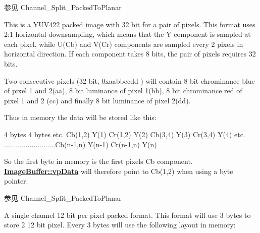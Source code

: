 \begin{Desc}
\begin{description}
\begin{DoxySeeAlso}{参见}
Channel\+\_\+\+Split\+\_\+\+Packed\+To\+Planar 
\end{DoxySeeAlso}
\item[{\em 
\hypertarget{group___common_interface_gga02e0fc32ff10e0bc0f2e8b9c321d65c9a94702ea714cdae3d691e8b0fff84182c}{idpf\+Y\+U\+V422\+\_\+\+U\+Y\+V\+Y\+Packed}\label{group___common_interface_gga02e0fc32ff10e0bc0f2e8b9c321d65c9a94702ea714cdae3d691e8b0fff84182c}
}]This is a Y\+U\+V422 packed image with 32 bit for a pair of pixels. This format uses 2\+:1 horizontal downsampling, which means that the Y component is sampled at each pixel, while U(\+Cb) and V(\+Cr) components are sampled every 2 pixels in horizontal direction. If each component takes 8 bits, the pair of pixels requires 32 bits.

Two consecutive pixels (32 bit, 0xaabbccdd ) will contain 8 bit chrominance blue of pixel 1 and 2(aa), 8 bit luminance of pixel 1(bb), 8 bit chrominance red of pixel 1 and 2 (cc) and finally 8 bit luminance of pixel 2(dd).

Thus in memory the data will be stored like this\+:


\begin{DoxyCode}
4 bytes                   4 bytes                         etc.
Cb(1,2) Y(1) Cr(1,2) Y(2) Cb(3,4)   Y(3)   Cr(3,4)   Y(4)    etc.
..........................Cb(n-1,n) Y(n-1) Cr(n-1,n) Y(n)
\end{DoxyCode}


So the first byte in memory is the first pixels Cb component. {\bfseries \hyperlink{struct_image_buffer_ab67c9c21d749e786302c848b508e0673}{Image\+Buffer\+::vp\+Data}} will therefore point to Cb(1,2) when using a byte pointer.

\begin{DoxySeeAlso}{参见}
Channel\+\_\+\+Split\+\_\+\+Packed\+To\+Planar 
\end{DoxySeeAlso}
\item[{\em 
\hypertarget{group___common_interface_gga02e0fc32ff10e0bc0f2e8b9c321d65c9abb60f8e9eb7c5224208f82f6634fae78}{idpf\+Mono12\+Packed\+\_\+\+V2}\label{group___common_interface_gga02e0fc32ff10e0bc0f2e8b9c321d65c9abb60f8e9eb7c5224208f82f6634fae78}
}]A single channel 12 bit per pixel packed format. This format will use 3 bytes to store 2 12 bit pixel. Every 3 bytes will use the following layout in memory\+:



\end{description}
\end{Desc}
